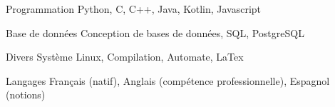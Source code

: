 

\begin{cvskills}
  \cvskill
    {Programmation} %
    {Python, C, C++, Java, Kotlin, Javascript} %

  \cvskill
    {Base de données} %
    {Conception de bases de données, SQL, PostgreSQL} %

  \cvskill
    {Divers} %
    {Système Linux, Compilation, Automate, LaTex} %

  \cvskill
    {Langages} %
    {Français (natif), Anglais (compétence professionnelle), Espagnol (notions)} %


\end{cvskills}
